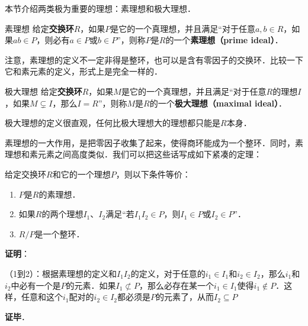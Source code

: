 

本节介绍两类极为重要的理想：素理想和极大理想．





\begin{definition}{素理想}
给定\textbf{交换环}$R$，如果$P$是它的一个真理想，并且满足“对于任意$a, b\in R$，如果$ab\in P$，则必有$a\in P$或$b\in P$”，则称$P$是$R$的一个\textbf{素理想（prime ideal）}．
\end{definition}

注意，素理想的定义不一定非得是整环，也可以是含有零因子的交换环．比较一下它和素元素的定义，形式上是完全一样的．

\begin{definition}{极大理想}
给定\textbf{交换环}$R$，如果$M$是它的一个真理想，并且满足“对于任意$R$的理想$I$，如果$M\subsetneq I$，那么$I=R$”，则称$M$是$R$的一个\textbf{极大理想（maximal ideal）}．
\end{definition}

极大理想的定义很直观，任何比极大理想大的理想都只能是$R$本身．

素理想的一大作用，是把零因子收集了起来，使得商环能成为一个整环．同时，素理想和素元素之间高度类似．我们可以把这些话写成如下紧凑的定理：

\begin{theorem}{}
给定交换环$R$和它的一个理想$P$，则以下条件等价：
\begin{enumerate}
\item $P$是$R$的素理想．
\item 如果$R$的两个理想$I_1$、$I_2$满足“若$I_1I_2\in P$，则$I_1\in P$或$I_2\in P$”．
\item $R/P$是一个整环．
\end{enumerate}
\end{theorem}

\textbf{证明}：

（1到2）：根据素理想的定义和$I_1I_2$的定义，对于任意的$i_1\in I_1$和$i_2\in I_2$，那么$i_1$和$i_2$中必有一个是$P$的元素．如果$I_1\not\subset P$，那么必存在某一个$i_1\in I_1$使得$i_1\not\in P$．这样，任意和这个$i_1$配对的$i_2\in I_2$都必须是$P$的元素了，从而$I_2\subseteq P$

\textbf{证毕}．




